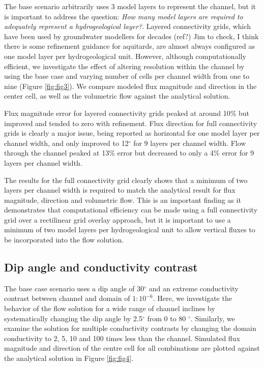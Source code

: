 \documentclass{article}
\begin{document}
The base scenario arbitrarily uses 3 model layers to represent the channel, but it is important to address the question: \emph{How many model layers are required to adequately represent a hydrogeological layer?}. Layered connectivity grids, which have been used by groundwater modellers for decades (ref?) {\color{red} Jim to check, I think there is some refinement guidance for aquitards}, are almost always configured as one model layer per hydrogeological unit. However, although computationally efficient, we investigate the effect of altering resolution within the channel by using the base case and varying number of cells per channel width from one to nine (Figure \ref{fig:fig3}). We compare modeled flux magnitude and direction in the center cell, as well as the volumetric flow against the analytical solution.

Flux magnitude error for layered connectivity grids peaked at around 10\% but improved and tended to zero with refinement. Flux direction for full connectivity grids is clearly a major issue, being reported as horizontal for one model layer per channel width, and only improved to 12$^{\circ}$ for 9 layers per channel width. Flow through the channel peaked at 13\% error but decreased to only a 4\% error for 9 layers per channel width.

The results for the full connectivity grid clearly shows that a minimum of two layers per channel width is required to match the analytical result for flux magnitude, direction and volumetric flow. This is an important finding as it demonstrates that computational efficiency can be made using a full connectivity grid over a rectilinear grid overlay approach, but it is important to use a minimum of two model layers per hydrogeological unit to allow vertical fluxes to be incorporated into the flow solution. 

\subsection{Dip angle and conductivity contrast}

The base case scenario uses a dip angle of 30$^{\circ}$ and an extreme conductivity contrast between channel and domain of $1:10^{-6}$. Here, we investigate the behavior of the flow solution for a wide range of channel inclines by systematically changing the dip angle by 2.5$^{\circ}$ from 0 to 80 $^{\circ}$. Similarly, we examine the solution for multiple conductivity contrasts by changing the domain conductivity to 2, 5, 10 and 100 times less than the channel. Simulated flux magnitude and direction of the centre cell for all combinations are plotted against the analytical solution in Figure \ref{fig:fig4}. 
\end{document}
